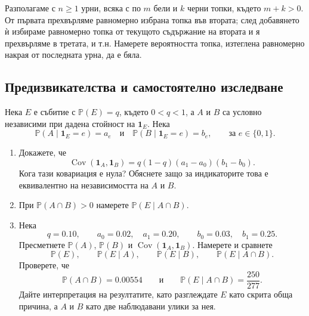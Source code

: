 \documentclass[11pt,a4paper]{article}
\newenvironment{enumeratea}{\begin{enumerate}[label=(\alph*),itemsep=0.28em,topsep=0.25em]}{\end{enumerate}}
\newcommand{\Pbb}{\mathbb P}
\newcommand{\Cov}{\operatorname{Cov}}
\newcommand{\ind}{\mathbf 1}
\newcounter{problem}[section]
\begin{document}
\begin{problem}
Разполагаме с $n\ge1$ урни, всяка с по $m$ бели и $k$ черни топки,
където $m+k>0$. От първата прехвърляме равномерно избрана топка във втората;
след добавянето ѝ избираме равномерно топка от текущото съдържание на втората
и я прехвърляме в третата, и т.н.
Намерете вероятността топка, изтеглена равномерно накрая от последната урна,
да е бяла.
\end{problem}


\subsection*{Предизвикателства и самостоятелно изследване}

\begin{problemstar}
Нека $E$ е събитие с $\Pbb(E)=q$, където $0<q<1$, а $A$ и $B$ са
условно независими при дадена стойност на $\ind_E$. Нека
\[
\Pbb(A\mid \ind_E=e)=a_e
\quad\text{и}\quad
\Pbb(B\mid \ind_E=e)=b_e,
\qquad
\text{за }e\in\{0,1\}.
\]
\begin{enumeratea}
  \item Докажете, че
  \[
  \Cov(\ind_A,\ind_B)
  =q(1-q)(a_1-a_0)(b_1-b_0).
  \]
  Кога тази ковариация е нула? Обяснете защо за индикаторите това е
  еквивалентно на независимостта на $A$ и $B$.

  \item При $\Pbb(A\cap B)>0$ намерете $\Pbb(E\mid A\cap B)$.

  \item Нека
  \[
  q=0.10,\qquad
  a_0=0.02,\quad a_1=0.20,\qquad
  b_0=0.03,\quad b_1=0.25.
  \]
  Пресметнете $\Pbb(A)$, $\Pbb(B)$ и $\Cov(\ind_A,\ind_B)$.
  Намерете и сравнете
  \[
  \Pbb(E),\qquad
  \Pbb(E\mid A),\qquad
  \Pbb(E\mid B),\qquad
  \Pbb(E\mid A\cap B).
  \]
  Проверете, че
  \[
  \Pbb(A\cap B)=0.00554
  \qquad\text{и}\qquad
  \Pbb(E\mid A\cap B)=\frac{250}{277}.
  \]
  Дайте интерпретация на резултатите, като разглеждате $E$ като скрита
  обща причина, а $A$ и $B$ като две наблюдавани улики за нея.
\end{enumeratea}
\end{problemstar}
\end{document}
